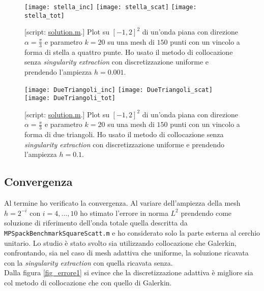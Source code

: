 \begin{figure}
	\centering
	\texttt{[image: stella\_inc]}
	\texttt{[image: stella\_scat]}
	\texttt{[image: stella\_tot]}
	\caption{[script: \href{https://github.com/Daldossi/BEM/blob/main/solution.m}{solution.m}.] Plot su $[-1,2]^2$ di un'onda piana con direzione $\alpha=\frac{\pi}{3}$ e parametro $k=20$ su una mesh di $150$ punti con un vincolo a forma di stella a quattro punte. Ho usato il metodo di collocazione senza \textit{singularity extraction} con discretizzazione uniforme e prendendo l'ampiezza $h=0.001$.}
	\label{stella}
\end{figure}
\begin{figure}
	\centering
	\texttt{[image: DueTriangoli\_inc]}
	\texttt{[image: DueTriangoli\_scat]}
	\texttt{[image: DueTriangoli\_tot]}
	\caption{[script: \href{https://github.com/Daldossi/BEM/blob/main/solution.m}{solution.m}.] Plot su $[-1,2]^2$ di un'onda piana con direzione $\alpha=\frac{\pi}{3}$ e parametro $k=20$ su una mesh di $150$ punti con un vincolo a forma di due triangoli. Ho usato il metodo di collocazione senza \textit{singularity extraction} con discretizzazione uniforme e prendendo l'ampiezza $h=0.1$.}
	\label{2triangoli}
\end{figure}



\subsection{Convergenza}
Al termine ho verificato la convergenza. Al variare dell'ampiezza della mesh $h=2^{-i}$ con $i=4,\dots,10$ ho stimato l'errore in norma $L^2$ prendendo come soluzione di riferimento dell'onda totale quella descritta da \verb|MPSpackBenchmarkSquareScatt.m| e ho considerato solo la parte esterna al cerchio unitario. Lo studio è stato svolto sia utilizzando collocazione che Galerkin, confrontando, sia nel caso di mesh adattiva che uniforme, la soluzione ricavata con la \textit{singularity extraction} con quella ricavata senza.\\
Dalla figura \ref{fig_errore1} si evince che la discretizzazione adattiva è migliore sia col metodo di collocazione che con quello di Galerkin.

